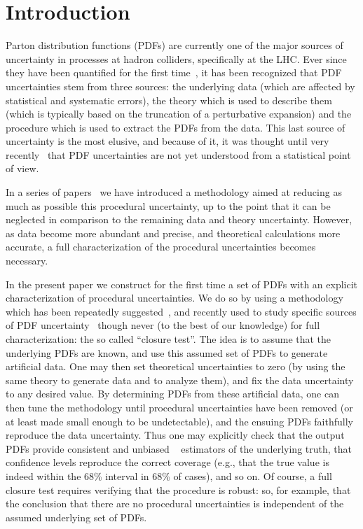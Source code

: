 \section{Introduction}
\label{sec:introduction}

Parton distribution functions (PDFs) are currently one of the major
sources of uncertainty in processes at hadron colliders, specifically at
the LHC. Ever since they have been quantified for the first time~\cite{dflm},
it has been recognized that PDF uncertainties stem from three
sources: the underlying data (which are affected by statistical and
systematic errors), the theory which is used to describe them
(which is typically based on the truncation of a perturbative
expansion) and the procedure which is used to extract the PDFs from
the data. This last source of uncertainty is the most elusive, and because
of it, it was thought until very recently~\cite{demortier} that PDF
uncertainties are not yet understood from a statistical point of view.

In a series of
papers~\cite{Forte:2002fg,DelDebbio:2004qj,DelDebbio:2007ee,Ball:2008by,Rojo:2008ke,Ball:2009mk,Ball:2009qv,Ball:2010de,Ball:2011mu,Ball:2011uy,Ball:2012cx}
we have introduced a methodology aimed at reducing as much as possible
this procedural uncertainty, up to the point that
it can be neglected in comparison to the remaining data and theory
uncertainty. However, as data become more abundant and precise, and
theoretical calculations more accurate, a full characterization of the
procedural uncertainties becomes necessary.

In the present paper we construct for the first time a set of PDFs
with 
an explicit characterization of procedural uncertainties. We do
so by using a methodology which has been repeatedly
suggested~\cite{demortier}, and recently used to study specific
sources of PDF uncertainty~\cite{Watt:2012tq} though never (to the best
of our knowledge) for full characterization: the so called ``closure
test''. The idea is to assume that the underlying PDFs are known, and use
this assumed set of PDFs to generate artificial data. One may then set
theoretical uncertainties to zero (by using the same theory to
generate data and to analyze them), and  fix the data
uncertainty to any desired value. By determining
PDFs from these artificial data, one can then tune the methodology
until procedural uncertainties have been removed (or at least made
small enough to be undetectable), and the ensuing PDFs faithfully
reproduce the data uncertainty. Thus
one may explicitly check that the output PDFs provide consistent and
unbiased ~\cite{cowan} estimators of the underlying truth, that
confidence levels reproduce the correct coverage (e.g., that the true
value is indeed within the 68\% interval in 68\% of cases), and so
on. Of course, a full closure test requires verifying that the
procedure is robust: so, for example, that the conclusion that there
are no procedural uncertainties is independent of the assumed
underlying set of PDFs.

